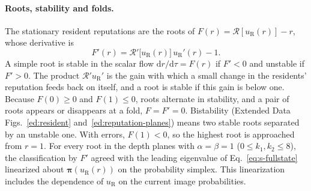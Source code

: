 \documentclass[10pt]{wlscirep}
\newcommand{\Rmap}{\mathscr{R}}            %
\newcommand{\dd}{\mathrm{d}}
\theoremstyle{plain}
\theoremstyle{remark}
\begin{document}
\paragraph{Roots, stability and folds.} The stationary resident reputations are the roots of $F(r)=\Rmap[u_{\mathrm R}(r)]-r$, whose derivative is
\begin{equation}
F'(r)=\Rmap'\bigl[u_{\mathrm R}(r)\bigr]\,u_{\mathrm R}'(r)-1.
\label{eq:s-F}
\end{equation}
A simple root is stable in the scalar flow $\dd r/\dd\tau=F(r)$ if $F'<0$ and unstable if $F'>0$. The product $\Rmap'u_{\mathrm R}'$ is the gain with which a small change in the residents' reputation feeds back on itself, and a root is stable if this gain is below one. Because $F(0)\geq0$ and $F(1)\leq0$, roots alternate in stability, and a pair of roots appears or disappears at a fold, $F=F'=0$. Bistability (Extended Data Figs.~\ref{ed:resident} and~\ref{ed:reputation-planes}) means two stable roots separated by an unstable one. With errors, $F(1)<0$, so the highest root is approached from $r=1$. For every root in the depth planes with $\alpha=\beta=1$ ($0\leq k_1,k_2\leq8$), the classification by $F'$ agreed with the leading eigenvalue of Eq.~\eqref{eq:s-fullstate} linearized about $\bm\pi(u_{\mathrm R}(r))$ on the probability simplex. This linearization includes the dependence of $u_{\mathrm R}$ on the current image probabilities.
\end{document}
